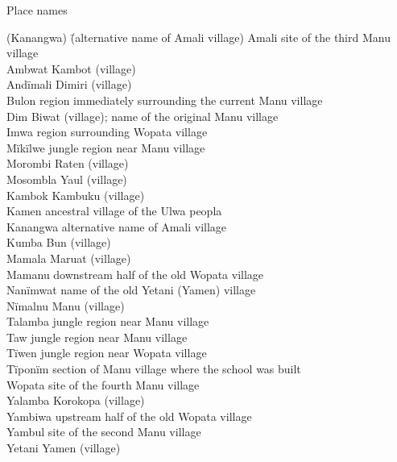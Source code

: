 \ea%
    \label{ex:sem:38}
          Place names
\begin{tabbing}
    {(Kanangwa)} \= {(alternative name of Amali village)}\kill
    Amali \> site of the third Manu village\\
    Ambwat \> Kambot (village)\\
    Andïmali \> Dimiri (village)\\
    Bulon \> region immediately surrounding the current Manu village\\
    Dim \> Biwat (village); name of the original Manu village\\
    Imwa \> region surrounding Wopata village\\
    Mïkïlwe \> jungle region near Manu village\\
    Morombi \> Raten (village)\\
    Mosombla \> Yaul (village)\\
    Kambok \> Kambuku (village)\\
    Kamen \> ancestral village of the Ulwa peopla\\
    Kanangwa \> alternative name of Amali village\\
    Kumba \> Bun (village)\\
    Mamala \> Maruat (village)\\
    Mamanu \> downstream half of the old Wopata village\\
    Nanïmwat \> name of the old Yetani (Yamen) village\\
    Nïmalnu \> Manu (village)\\
    Talamba \> jungle region near Manu village\\
    Taw  \> jungle region near Manu village\\
    Tïwen \> jungle region near Wopata village\\
    Tïponïm \> section of Manu village where the school was built\\
    Wopata \> site of the fourth Manu village\\
    Yalamba \> Korokopa (village)\\
    Yambiwa \> upstream half of the old Wopata village\\
    Yambul \> site of the second Manu village\\
    Yetani \> Yamen (village)
  \end{tabbing}
\z


